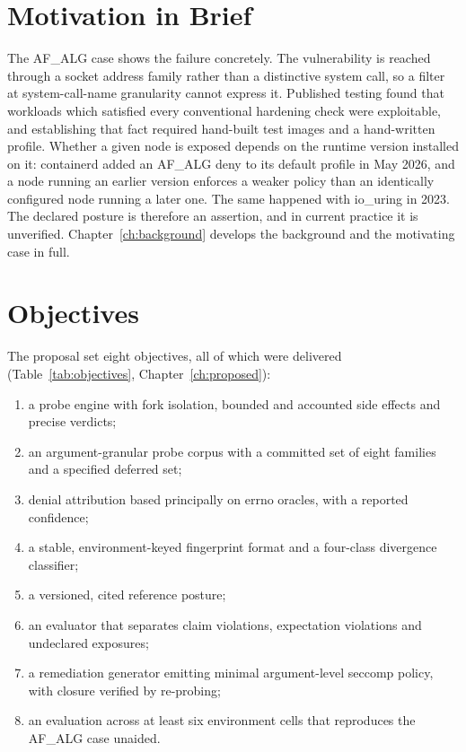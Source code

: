 \section{Motivation in Brief}

The AF\_ALG case shows the failure concretely. The vulnerability is reached through a socket address family rather than a distinctive system call, so a filter at system-call-name granularity cannot express it. Published testing found that workloads which satisfied every conventional hardening check were exploitable, and establishing that fact required hand-built test images and a hand-written profile. Whether a given node is exposed depends on the runtime version installed on it: containerd added an AF\_ALG deny to its default profile in May 2026, and a node running an earlier version enforces a weaker policy than an identically configured node running a later one. The same happened with io\_uring in 2023. The declared posture is therefore an assertion, and in current practice it is unverified. Chapter~\ref{ch:background} develops the background and the motivating case in full.

\section{Objectives}

The proposal set eight objectives, all of which were delivered (Table~\ref{tab:objectives}, Chapter~\ref{ch:proposed}):
\begin{enumerate}[leftmargin=*]
\item a probe engine with fork isolation, bounded and accounted side effects and precise verdicts;
\item an argument-granular probe corpus with a committed set of eight families and a specified deferred set;
\item denial attribution based principally on errno oracles, with a reported confidence;
\item a stable, environment-keyed fingerprint format and a four-class divergence classifier;
\item a versioned, cited reference posture;
\item an evaluator that separates claim violations, expectation violations and undeclared exposures;
\item a remediation generator emitting minimal argument-level seccomp policy, with closure verified by re-probing;
\item an evaluation across at least six environment cells that reproduces the AF\_ALG case unaided.
\end{enumerate}

